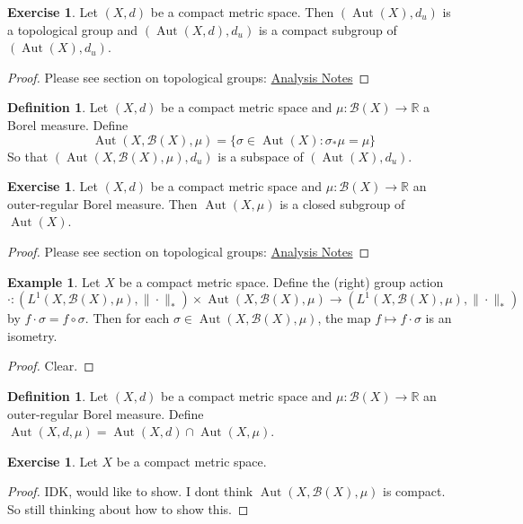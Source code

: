 \documentclass[12pt]{amsart}
\theoremstyle{definition}
\newtheorem{defn}[definition]{Definition}
\newtheorem{ex}[definition]{Exercise}
\newtheorem{exm}[definition]{Example}
\newcommand{\sig}{\sigma}
\newcommand{\R}{\mathbb{R}}
\newcommand{\MB}{\mathcal{B}}
\DeclareMathOperator{\Aut}{Aut}
\begin{document}
	\begin{ex}
	Let $(X, d)$ be a compact metric space. Then $(\Aut(X), d_{u} )$ is a topological group and $(\Aut(X, d), d_u)$ is a compact subgroup of $(\Aut(X), d_u)$.
	\end{ex}
	
	\begin{proof}
	Please see section on topological groups: \href{https://github.com/carsonaj/Mathematics/blob/master/Introduction\%20to\%20Analysis/Introduction\%20to\%20Analysis.pdf}{Analysis Notes}
	\end{proof}
	
	\begin{defn}
	Let $(X,d)$ be a compact metric space and $\mu: \MB(X) \rightarrow \R$ a Borel measure. Define $$\Aut(X, \MB(X), \mu) = \{\sig \in \Aut(X): \sig_* \mu = \mu\}$$ 
	So that $(\Aut(X, \MB(X), \mu), d_{u} )$ is a subspace of $(\Aut(X), d_{u})$.
	\end{defn}
	
	\begin{ex}
	Let $(X,d)$ be a compact metric space and $\mu: \MB(X) \rightarrow \R$ an outer-regular Borel measure. Then $\Aut(X, \mu)$ is a closed subgroup of $\Aut(X)$.
	\end{ex}
	
	\begin{proof}
	Please see section on topological groups: \href{https://github.com/carsonaj/Mathematics/blob/master/Introduction\%20to\%20Analysis/Introduction\%20to\%20Analysis.pdf}{Analysis Notes}
	\end{proof}
	
	\begin{exm}
	Let $X$ be a compact metric space. Define the (right) group action \\ $\cdot: (L^1(X, \MB(X), \mu), \|\cdot\|_*) \times \Aut(X, \MB(X), \mu) \rightarrow (L^1(X, \MB(X), \mu), \|\cdot\|_*) $ by $f \cdot \sig = f \circ \sig$. Then for each $\sig \in \Aut(X, \MB(X), \mu)$, the map $f \mapsto f \cdot \sig$ is an isometry. 
	\end{exm}
	
	\begin{proof}
	Clear.
	\end{proof}
	
	\begin{defn}
	Let $(X,d)$ be a compact metric space and $\mu: \MB(X) \rightarrow \R$ an outer-regular Borel measure. Define $\Aut(X, d, \mu) = \Aut(X, d) \cap \Aut(X, \mu)$.
	\end{defn}	
	
	\begin{ex}
	Let $X$ be a compact metric space. 
	\end{ex}
	
	\begin{proof}
	IDK, would like to show. I dont think $\Aut(X, \MB(X), \mu)$ is compact. So still thinking about how to show this.
	\end{proof}
	
	
\end{document}
